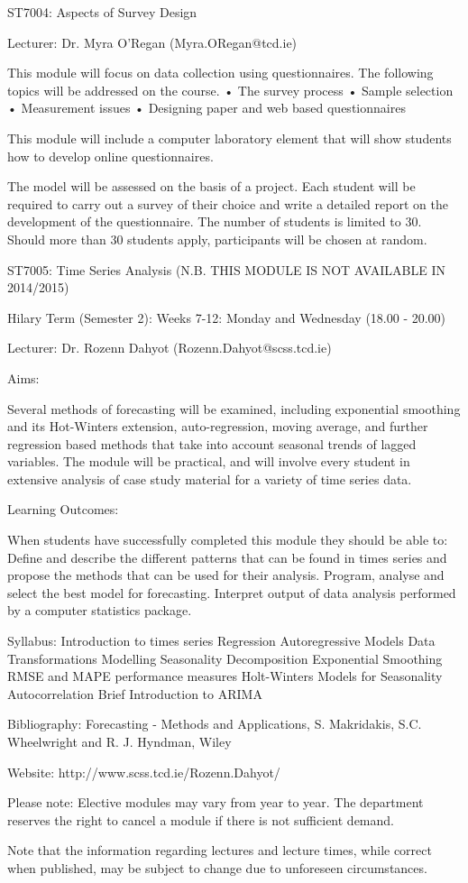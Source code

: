  

ST7004: Aspects of Survey Design 

Lecturer: Dr. Myra O'Regan (Myra.ORegan@tcd.ie)
 
This module will focus on data collection using questionnaires.   The following topics will be addressed on the course.
•        The survey process
•        Sample selection
•        Measurement issues
•        Designing paper and web based questionnaires

 This module will include a computer laboratory element that will show students how to develop online questionnaires.
 
The model will be assessed on the basis of a project.  Each student will be required to carry out a survey of their 
choice and write a detailed report on the development of the questionnaire.   The number of students is limited to 30.  Should more than 30 students apply, participants will be chosen at random.
  
 
 
 
ST7005: Time Series Analysis (N.B. THIS MODULE IS NOT AVAILABLE IN 2014/2015)
 
Hilary Term (Semester 2): Weeks 7-12: Monday and Wednesday (18.00 - 20.00) 


Lecturer: Dr. Rozenn Dahyot (Rozenn.Dahyot@scss.tcd.ie)
 
Aims:
 
Several methods of forecasting will be examined, including exponential smoothing and its Hot-Winters extension, auto-regression, moving average, and further regression based methods that take into account seasonal trends of lagged variables. The module will be practical, and will involve every student in extensive analysis of case study material for a variety of time series data.
 
Learning Outcomes:
 
When students have successfully completed this module they should be able to:
 Define and describe the different patterns that can be found in times series and propose the methods that can be used for their analysis.
Program, analyse and select the best model for forecasting.
Interpret output of data analysis performed by a computer statistics package.
 
Syllabus:
 Introduction to times series
Regression
Autoregressive Models
Data Transformations
Modelling Seasonality
Decomposition
Exponential Smoothing
RMSE and MAPE performance measures
Holt-Winters Models for Seasonality
Autocorrelation
Brief Introduction to ARIMA
 
Bibliography: Forecasting - Methods and Applications, S. Makridakis, S.C. Wheelwright and R. J. Hyndman, Wiley
 
Website: http://www.scss.tcd.ie/Rozenn.Dahyot/
 
 
 
Please note: 
Elective modules may vary from year to year. The department reserves the right to cancel a module if there is not sufficient demand. 

Note that the information regarding lectures and lecture times, while correct when published, may be subject to change due to unforeseen circumstances. 
